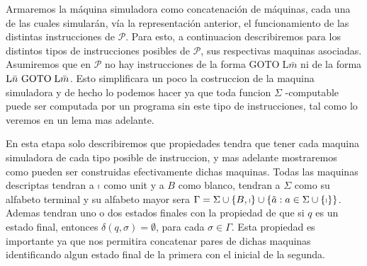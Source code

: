 \begin{frame}
	\PN Armaremos la máquina simuladora como concatenación de máquinas, cada una de las cuales simularán, vía la
	representación anterior, el funcionamiento de las distintas instrucciones de $\mathcal{P}$. Para esto, a
	continuacion describiremos para los distintos tipos de instrucciones
	posibles de $\mathcal{P}$, sus respectivas maquinas asociadas. Asumiremos
	que en $\mathcal{P}$ no hay instrucciones de la forma $\mathrm{GOTO}\;%
	\mathrm{L}\bar{m}$ ni de la forma $\mathrm{L}\bar{n}\ \mathrm{GOTO}\;\mathrm{%
	L}\bar{m}$. Esto simplificara un poco la costruccion de la maquina
	simuladora y de hecho lo podemos hacer ya que toda funcion $\Sigma $%
	-computable puede ser computada por un programa sin este tipo de
	instrucciones, tal como lo veremos en un lema mas adelante.

	En esta etapa solo describiremos que propiedades tendra que tener cada
	maquina simuladora de cada tipo posible de instruccion, y mas adelante
	mostraremos como pueden ser construidas efectivamente dichas maquinas. Todas
	las maquinas descriptas tendran a $\shortmid $ como unit y a $B$ como
	blanco, tendran a $\Sigma $ como su alfabeto terminal y su alfabeto mayor
	sera $\Gamma =\Sigma \cup \{B,\shortmid \}\cup \{\tilde{a}:a\in \Sigma \cup
	\{\shortmid \}\}$. Ademas tendran uno o dos estados finales con la propiedad
	de que si $q$ es un estado final, entonces $\delta (q,\sigma )=\emptyset $,
	para cada $\sigma \in \Gamma $. Esta propiedad es importante ya que nos
	permitira concatenar pares de dichas maquinas identificando algun estado
	final de la primera con el inicial de la segunda.
\end{frame}
